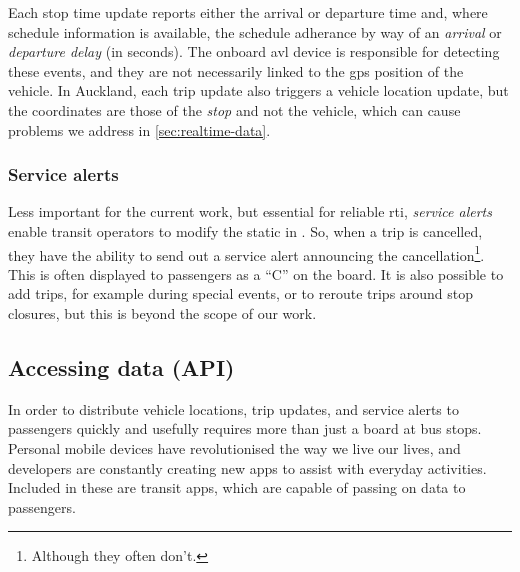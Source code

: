 Each stop time update reports either the arrival or departure time and, where schedule information is available, the schedule adherance by way of an \emph{arrival} or \emph{departure delay} (in seconds). The onboard \gls{avl} device is responsible for detecting these events, and they are not necessarily linked to the \gls{gps} position of the vehicle. In Auckland, each trip update also triggers a vehicle location update, but the coordinates are those of the \emph{stop} and not the vehicle, which can cause problems we address in \cref{sec:realtime-data}.



\subsubsection{Service alerts}
\label{sec:gtfs_rt_alerts}

Less important for the current work, but essential for reliable \gls{rti}, \emph{service alerts} enable transit operators to modify the static \GTFS{} in \rt{}. So, when a trip is cancelled, they have the ability to send out a service alert announcing the cancellation\footnote{Although they often don't.}. This is often displayed to passengers as a ``C'' on the \rt{} board. It is also possible to add trips, for example during special events, or to reroute trips around stop closures, but this is beyond the scope of our work.



\subsection{Accessing \rt{} data (API)}
\label{sec:gtfs_rt_api}

In order to distribute vehicle locations, trip updates, and service alerts to passengers quickly and usefully requires more than just a \rt{} board at bus stops. Personal mobile devices have revolutionised the way we live our lives, and developers are constantly creating new apps to assist with everyday activities. Included in these are transit apps, which are capable of passing on \rt{} \GTFS{} data to passengers.

